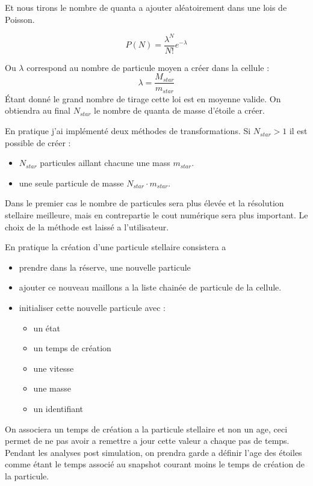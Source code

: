 Et nous tirons le nombre de quanta a ajouter aléatoirement dans une lois de Poisson.

\begin{equation}
	P(N) = \frac{\lambda^N}{N!} e^{-\lambda}
\end{equation}

Ou $\lambda$ correspond au nombre de particule moyen a créer dans la cellule :
\begin{equation}
\lambda = \frac{ M_{star}}{m_{star}}
\end{equation}
Étant donné le grand nombre de tirage cette loi est en moyenne valide.
On obtiendra au final $N_{star}$ le nombre de quanta de masse d'étoile a créer.


En pratique j'ai implémenté deux méthodes de transformations.
Si  $N_{star}>1$ il est possible de créer : 
\begin{itemize}
\item  $N_{star}$ particules aillant chacune une mass  $m_{star}$.
\item une seule particule de masse  $N_{star} \cdot m_{star}$.
\end{itemize}

Dans le premier cas le nombre de particules sera plus élevée et la résolution stellaire meilleure, mais en contrepartie le cout numérique sera plus important.
Le choix de la méthode est laissé a l'utilisateur.

En pratique la création d'une particule stellaire consistera a 
\begin{itemize}
\item prendre dans la réserve, une nouvelle particule %
\item ajouter ce nouveau maillons a la liste chainée de particule de la cellule.
\item initialiser cette nouvelle particule avec : 
\begin{itemize}
\item un état
\item un temps de création
\item une vitesse 
\item une masse
\item un identifiant
\end{itemize}
\end{itemize}


On associera un temps de création a la particule stellaire et non un age, ceci permet de ne pas avoir a remettre a jour cette valeur a chaque pas de temps.
Pendant les analyses post simulation, on prendra garde a définir l'age des étoiles comme étant le temps associé au snapshot courant moins le temps de création de la particule.

